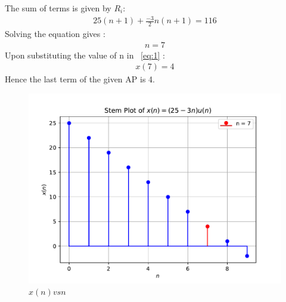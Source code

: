\documentclass[journal,12pt,twocolumn]{IEEEtran}
\theoremstyle{remark}
\begin{document}
The sum of terms is given by $R_i$:
 \begin{align}
25(n+1)	+ \frac{-3}{2} n(n+1) = 116 
 \end{align}
Solving the equation gives :
\begin{align}
	n=7
\end{align}
Upon substituting the value of n in ~\ref{eq:1} :
\begin{align}
	x(7)=4
\end{align}
Hence the last term of the given AP is 4.
\begin{figure}[h!]
	\centering
	\includegraphics[width=\columnwidth]{figs/stem_plot.pdf}
	\caption{$x(n) vs n$}
	\label{fig:plot}
\end{figure}
\end{document}
